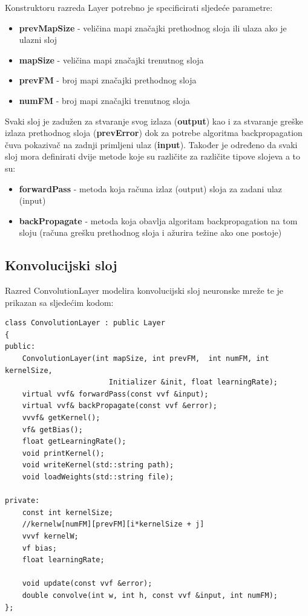 \documentclass[times, utf8, zavrsni, numeric]{fer}
\begin{document}
Konstruktoru razreda Layer potrebno je specificirati sljedeće parametre:
\begin{itemize}
\item \textbf{prevMapSize} - veličina mapi značajki prethodnog sloja ili ulaza ako je ulazni sloj
\item \textbf{mapSize} - veličina mapi značajki trenutnog sloja
\item \textbf{prevFM} - broj mapi značajki prethodnog sloja
\item \textbf{numFM} - broj mapi značajki trenutnog sloja
\end{itemize}

Svaki sloj je zadužen za stvaranje svog izlaza (\textbf{output}) kao i za stvaranje greške izlaza prethodnog sloja (\textbf{prevError}) dok za potrebe algoritma backpropagation čuva pokazivač na zadnji primljeni ulaz (\textbf{input}). Također je određeno da svaki sloj mora definirati dvije metode koje su različite za različite tipove slojeva a to su:
\begin{itemize}
\item \textbf{forwardPass} - metoda koja računa izlaz (output) sloja za zadani ulaz (input)
\item \textbf{backPropagate} - metoda koja obavlja algoritam backpropagation na tom sloju (računa grešku prethodnog sloja i ažurira težine ako one postoje)
\end{itemize}

\subsection{Konvolucijski sloj}
Razred ConvolutionLayer modelira konvolucijski sloj neuronske mreže te je prikazan sa sljedećim kodom:
\begin{lstlisting}[caption=Razred ConvolutionLayer,
  label=ConvLayer]
class ConvolutionLayer : public Layer
{
public:
    ConvolutionLayer(int mapSize, int prevFM,  int numFM, int kernelSize, 
    					Initializer &init, float learningRate); 
    virtual vvf& forwardPass(const vvf &input);
    virtual vvf& backPropagate(const vvf &error);
    vvvf& getKernel();
    vf& getBias();
    float getLearningRate();
    void printKernel();
    void writeKernel(std::string path);
    void loadWeights(std::string file);

private:
    const int kernelSize;
    //kernelw[numFM][prevFM][i*kernelSize + j]
    vvvf kernelW;
    vf bias;
    float learningRate;

    void update(const vvf &error);
    double convolve(int w, int h, const vvf &input, int numFM);
};
\end{lstlisting}
\end{document}
